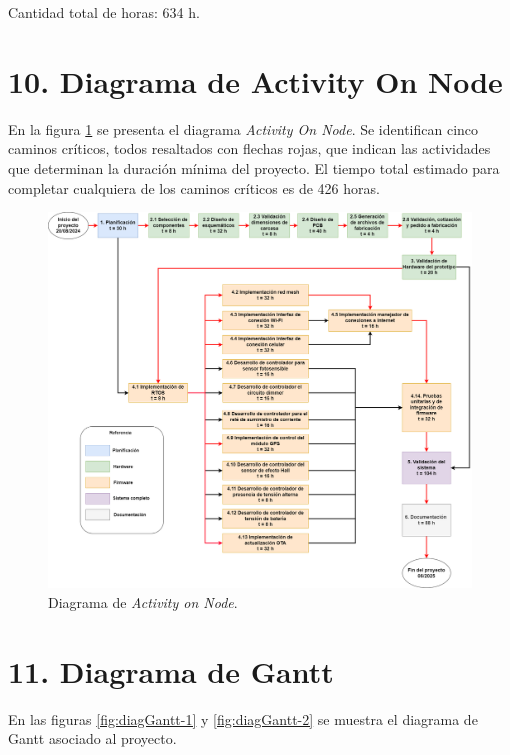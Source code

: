 \documentclass[
11pt, %
]{charter}
\begin{document}
Cantidad total de horas: 634 h.

\pagebreak

\section{10. Diagrama de Activity On Node}
\label{sec:AoN}

En la figura \ref{fig:AoN} se presenta el diagrama \textit{Activity On Node}. Se identifican cinco caminos críticos, todos resaltados con flechas rojas, que indican las actividades que determinan la duración mínima del proyecto. El tiempo total estimado para completar cualquiera de los caminos críticos es de 426 horas.


\begin{figure}[htpb]
\centering 
\includegraphics[width=1\textwidth]{./Figuras/AoN.png}
\caption{Diagrama de \textit{Activity on Node}.}
\label{fig:AoN}
\end{figure}

\section{11. Diagrama de Gantt}
\label{sec:gantt}
En las figuras \ref{fig:diagGantt-1} y \ref{fig:diagGantt-2} se muestra el diagrama de Gantt asociado al proyecto.
\end{document}
